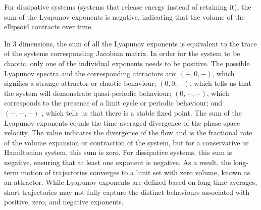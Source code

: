 For dissipative systems (systems that release energy instead of retaining it), the sum of the Lyapunov exponents is negative, indicating that the volume of the ellipsoid contracts over time.

In 3 dimensions, the sum of all the Lyapunov exponents is equivalent to the trace of the systems corresponding Jacobian matrix. 
In order for the system to be chaotic, only one of the individual exponents needs to be positive.
The possible Lyapunov spectra and the corresponding attractors are: $(+,0,-)$, which signifies a strange attractor or chaotic behaviour; $(0,0,-)$, which tells us that the system will demonstrate quasi-periodic behaviour;
$(0,-,-)$, which corresponds to the presence of a limit cycle or periodic behaviour; and $(-,-,-)$ , which tells us that there is a stable fixed point. 
The sum of the Lyapunov exponents equals the time-averaged divergence of the phase space velocity. 
The value indicates the divergence of the flow and is the fractional rate of the volume expansion or contraction of the system, but for a conservative or Hamiltonian system, this sum is zero. 
For dissipative systems, this sum is negative, ensuring that at least one exponent is negative. 
As a result, the long-term motion of trajectories converges to a limit set with zero volume, known as an attractor. 
While Lyapunov exponents are defined based on long-time averages, short trajectories may not fully capture the distinct behaviours associated with positive, zero, and negative exponents.



